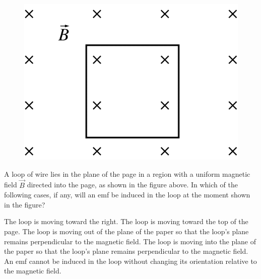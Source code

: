 \begin{figure}[H]
    \centering
    \includegraphics[scale=0.3]{images/img-005-008.png}
\end{figure}

\begin{questions}\setcounter{question}{7}\question
A loop of wire lies in the plane of the page in a region with a uniform magnetic field $\vec{B}$ directed into the page, as shown in the figure above. In which of the following cases, if any, will an emf be induced in the loop at the moment shown in the figure?

\begin{choices}
\choice The loop is moving toward the right.
\choice The loop is moving toward the top of the page.
\choice The loop is moving out of the plane of the paper so that the loop's plane remains perpendicular to the magnetic field.
\choice The loop is moving into the plane of the paper so that the loop's plane remains perpendicular to the magnetic field.
\choice An emf cannot be induced in the loop without changing its orientation relative to the magnetic field.
\end{choices}\end{questions}
